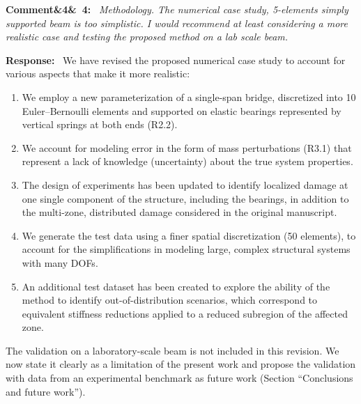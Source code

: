 \documentclass[11pt]{article}
\newenvironment{rcomment}[1]{\par\bigskip\noindent\textbf{Comment\ifx&#1&\else\ #1\fi:}\ \itshape}{\par}
\newenvironment{response}{\par\smallskip\noindent\color{resp}\textbf{Response:}\ }{\par}
\newenvironment{action}{\par\smallskip\noindent\color{resp}\textbf{Action:}\ }{\par}
\newcommand{\tbd}[1]{\textcolor{note}{\textsf{[#1]}}}
\newcommand{\lines}[1]{\tbd{lines #1}}
\begin{document}
\begin{rcomment}{4}
Methodology. The numerical case study, 5-elements simply supported beam is too simplistic. I would recommend at least
considering a more realistic case and testing the proposed method on a lab scale beam.
\end{rcomment}

\begin{response}
We have revised the proposed numerical case study to account for various aspects that make it more realistic:
\begin{enumerate}[leftmargin=*,label=(\arabic*)]
\item We employ a new parameterization of a single-span bridge, discretized into 10 Euler--Bernoulli elements and supported on elastic bearings represented by vertical springs at both ends (R2.2).
\item We account for modeling error in the form of mass perturbations (R3.1) that represent a lack of knowledge (uncertainty) about the true system properties. 
\item The design of experiments has been updated to identify localized damage at one single component of the structure, including the bearings, in addition to the multi-zone, distributed damage considered in the original manuscript.
\item We generate the test data using a finer spatial discretization (50 elements), to account for the simplifications in modeling large, complex structural systems with many DOFs.

\item An additional test dataset has been created to explore the ability of the method to identify out-of-distribution scenarios, which correspond to equivalent stiffness reductions applied to a reduced subregion of the affected zone.
\end{enumerate}
The validation on a laboratory-scale beam is not included in this revision.
We now state it clearly as a limitation of the
present work and propose the validation with data from an experimental benchmark as future work  (Section ``Conclusions and future work'').
\end{response}

\end{document}
